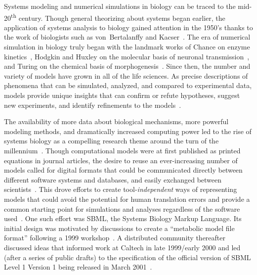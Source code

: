 \documentclass{sbml-paper}
\begin{document}
Systems modeling and numerical simulations in biology can be traced to the mid-20\textsuperscript{th} century. Though general theorizing about systems began earlier, the application of systems analysis to biology gained attention in the 1950's thanks to the work of biologists such as von~Bertalanffy and Kacser~\citep{Von_Bertalanffy1950-dy, Von_Bertalanffy1950-wa, Kacser1957-ox}. The era of numerical simulation in biology truly began with the landmark works of Chance on enzyme kinetics~\citep{chance1952mechanism, chance1940kinetics}, Hodgkin and Huxley on the molecular basis of neuronal transmission~\citep{hodgkin1952quantitative}, and Turing on the chemical basis of morphogenesis~\citep{turing1990chemical}. Since then, the number and variety of models have grown in all of the life sciences. As precise descriptions of phenomena that can be simulated, analyzed, and compared to experimental data, models provide unique insights that can confirm or refute hypotheses, suggest new experiments, and identify refinements to the models~\citep{Heinrich1996, le_novere_2015}.

The availability of more data about biological mechanisms, more powerful modeling methods, and dramatically increased computing power led to the rise of systems biology as a compelling research theme around the turn of the millennium~\citep{kitano2000perspectives, ideker2001new}. Though computational models were at first published as printed equations in journal articles, the desire to reuse an ever-increasing number of models called for digital formats that could be communicated directly between different software systems and databases, and easily exchanged between scientists~\citep[topics of interest as early as the 1960's; c.f.][]{Garfinkel1969construction}. This drove efforts to create tool-\emph{independent} ways of representing models that could avoid the potential for human translation errors and provide a common starting point for simulations and analyses regardless of the software used~\citep{Lloyd2004-fd, Goddard2001-ix, hucka_2001}. One such effort was SBML, the Systems Biology Markup Language. Its initial design was motivated by discussions to create a ``metabolic model file format'' following a 1999 workshop~\citep{Cornish-Bowden2000technological, kell2008the}. A distributed community thereafter discussed ideas that informed work at Caltech in late 1999/early 2000 and led (after a series of public drafts) to the specification of the official version of SBML Level 1 Version 1 being released in March 2001~\citep{hucka_2003}.
\end{document}
